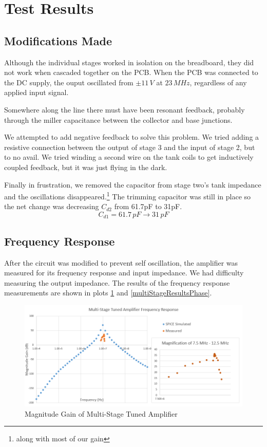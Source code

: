 \documentclass[titlepage, letterpaper, 10.5pt]{article}
\begin{document}
\clearpage
\section{Test Results}

\subsection{Modifications Made}

Although the individual stages worked in isolation on the
breadboard, they did not work when cascaded together on the PCB.
When the PCB was connected to the DC supply, the ouput oscillated
from $\pm11\,V$ at $23\,MHz$, regardless of any applied input signal.

Somewhere along the line there must have been resonant feedback,
probably through the miller capacitance between the collector and
base junctions.

We attempted to add negative feedback to solve this problem. We tried
adding a resistive connection between the output of stage 3 and the
input of stage 2, but to no avail. We tried winding a second wire on
the tank coils to get inductively coupled feedback, but it was just
flying in the dark.

Finally in frustration, we removed the capacitor from stage two's
tank impedance and the oscillations disappeared.\footnote{along
with most of our gain} The trimming capacitor was still in place
so the net change was decreasing $C_{d2}$ from 61.7pF to 31pF.
\begin{equation*}
C_{d1}=61.7\,pF\rightarrow 31\,pF
\end{equation*}

\subsection{Frequency Response}

After the circuit was modified to prevent self oscillation, the
amplifier was measured for its frequency response and input impedance.
We had difficulty measuring the output impedance. The results of the
frequency response measurements are shown in plots
\ref{multiStageResultsMag} and \ref{multiStageResultsPhase}.

\begin{figure}[ht]
	\centering
	\includegraphics[width=\textwidth]
		{measurements/multiStageResultsMag}
	\caption{Magnitude Gain of Multi-Stage Tuned Amplifier}
	\label{multiStageResultsMag}
\end{figure}
\end{document}
